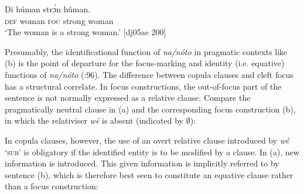 \ea%
    \label{ex:key:695}
\z\z


\ea%
    \label{ex:key:696}
    \gll Di  húman   strɔ́n  húman.\\
\textsc{def}  woman  \textsc{foc}  strong  woman\\

\glt ‘The woman is a strong woman.’ [dj05ae 200]
\z

Presumably, the identificational function of \textit{na}\textit{\textup{/}}\textit{nóto} in pragmatic contexts like (b) is the point of departure for the focus-marking and identity (i.e. equative) functions of \textit{na}\textit{\textup{/}}\textit{nóto} (\citealt{HeineKuteva2002}:96). The difference between copula clauses and cleft focus has a structural correlate. In focus constructions, the out-of-focus part of the sentence is not normally expressed as a relative clause. Compare the pragmatically neutral clause in (a) and the corresponding focus construction (b), in which the relativiser \textit{wé} is absent (indicated by ${\emptyset}$): 


\ea%
    \label{ex:key:697}
\z\z

In copula clauses, however, the use of an overt relative clause introduced by \textit{wé} ‘\textsc{sub}’ is obligatory if the identified entity is to be modified by a clause. In (a), new information is introduced. This given information is implicitly referred to by sentence (b), which is therefore best seen to constitute an equative clause rather than a focus construction: 


